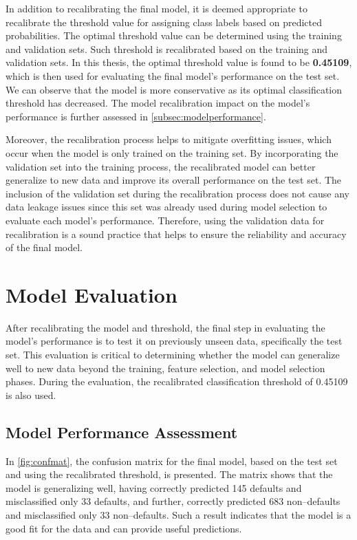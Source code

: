 In addition to recalibrating the final model, it is deemed appropriate to recalibrate the threshold value for assigning class labels based on predicted probabilities. The optimal threshold value can be determined using the training and validation sets. Such threshold is recalibrated based on the training and validation sets.
In this thesis, the optimal threshold value is found to be \textbf{0.45109}, which is then used for evaluating the final model's performance on the test set.
We can observe that the model is more conservative as its optimal classification threshold has decreased. The model recalibration impact on the model's performance is further assessed in \autoref{subsec:modelperformance}.

Moreover, the recalibration process helps to mitigate overfitting issues, which occur when the model is only trained on the training set.
By incorporating the validation set into the training process, the recalibrated model can better generalize to new data and improve its overall performance on the test set.
The inclusion of the validation set during the recalibration process does not cause any data leakage issues since this set was already used during model selection to evaluate each model's performance.
Therefore, using the validation data for recalibration is a sound practice that helps to ensure the reliability and accuracy of the final model.

\newpage
\section{Model Evaluation}
\label{sec:modeleval}
After recalibrating the model and threshold, the final step in evaluating the model's performance is to test it on previously unseen data, specifically the test set.
This evaluation is critical to determining whether the model can generalize well to new data beyond the training, feature selection, and model selection phases.
During the evaluation, the recalibrated classification threshold of 0.45109 is also used.
\subsection{Model Performance Assessment}
\label{subsec:modelperformance}



In \autoref{fig:confmat}, the confusion matrix for the final model, based on the test set and using the recalibrated threshold, is presented. The matrix shows that the model is generalizing well, having correctly predicted 145 defaults and misclassified only 33 defaults, and further, correctly predicted 683 non--defaults and misclassified only 33 non--defaults. Such a result indicates that the model is a good fit for the data and can provide useful predictions.

